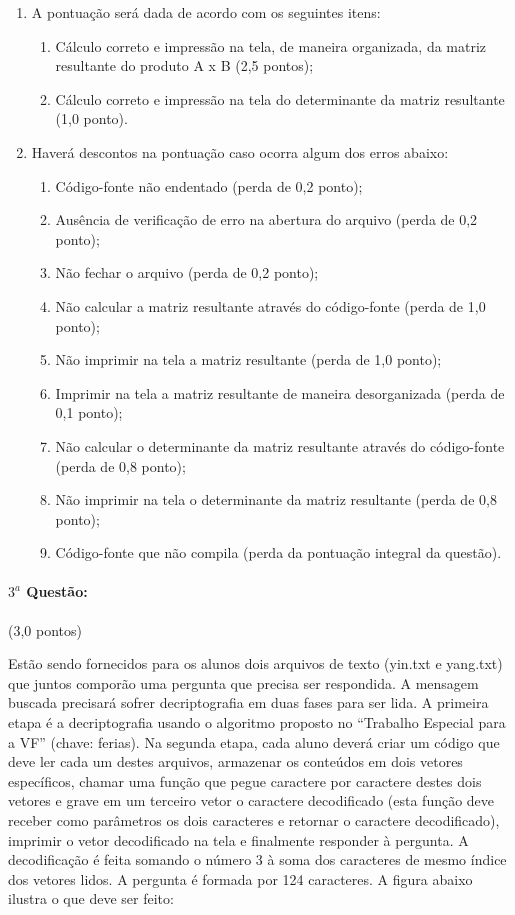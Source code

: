 \documentclass[12pt,a4paper]{article}
\begin{document}
\begin{enumerate}[label=\alph*.]
\item A pontuação será dada de acordo com os seguintes itens:
\begin{enumerate}[label=\roman*)]
\item Cálculo correto e impressão na tela, de maneira organizada, da matriz resultante do produto
A x B (2,5 pontos);
\item Cálculo correto e impressão na tela do determinante da matriz resultante (1,0 ponto).
\end{enumerate}
\item Haverá descontos na pontuação caso ocorra algum dos erros abaixo:
\begin{enumerate}[label=\roman*)]
\item Código-fonte não endentado (perda de 0,2 ponto);
\item Ausência de verificação de erro na abertura do arquivo (perda de 0,2 ponto);
\item Não fechar o arquivo (perda de 0,2 ponto);
\item Não calcular a matriz resultante através do código-fonte (perda de 1,0 ponto);
\item Não imprimir na tela a matriz resultante (perda de 1,0 ponto);
\item Imprimir na tela a matriz resultante de maneira desorganizada (perda de 0,1 ponto);
\item Não calcular o determinante da matriz resultante através do código-fonte (perda de 0,8
ponto);
\item Não imprimir na tela o determinante da matriz resultante (perda de 0,8 ponto);
\item Código-fonte que não compila (perda da pontuação integral da questão).
\end{enumerate}
\end{enumerate}
\paragraph{$3^a$ Questão:} (3,0 pontos)

Estão sendo fornecidos para os alunos dois arquivos de texto (yin.txt e
yang.txt) que juntos comporão uma pergunta que precisa ser respondida. A mensagem buscada
precisará sofrer decriptografia em duas fases para ser lida. A primeira etapa é a decriptografia usando o
algoritmo proposto no “Trabalho Especial para a VF” (chave: ferias). Na segunda etapa, cada aluno
deverá criar um código que deve ler cada um destes arquivos, armazenar os conteúdos em dois vetores
específicos, chamar uma função que pegue caractere por caractere destes dois vetores e grave em um
terceiro vetor o caractere decodificado (esta função deve receber como parâmetros os dois caracteres e
retornar o caractere decodificado), imprimir o vetor decodificado na tela e finalmente responder à
pergunta. A decodificação é feita somando o número 3 à soma dos caracteres de mesmo índice dos
vetores lidos. A pergunta é formada por 124 caracteres. A figura abaixo ilustra o que deve ser feito:
\end{document}
